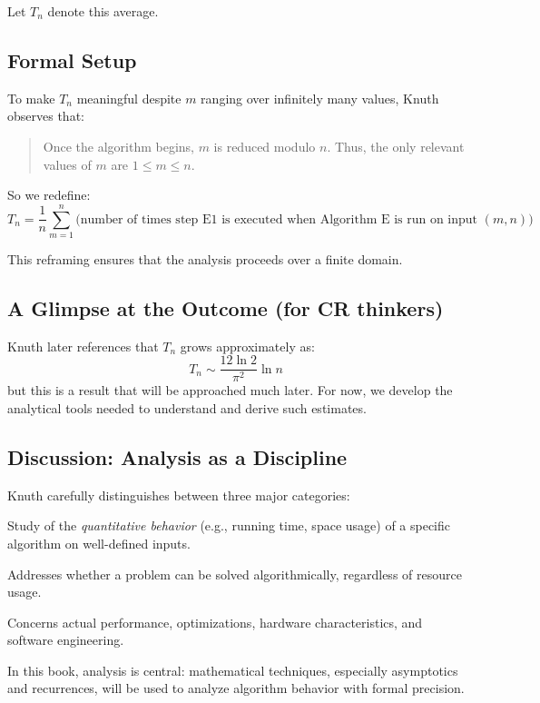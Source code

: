 \documentclass{article}
\begin{document}
Let $T_n$ denote this average.

\subsection*{Formal Setup}

To make $T_n$ meaningful despite $m$ ranging over infinitely many values, Knuth observes that:

\begin{quote}
Once the algorithm begins, $m$ is reduced modulo $n$. Thus, the only relevant values of $m$ are $1 \le m \le n$.
\end{quote}

So we redefine:
\[
T_n = \frac{1}{n} \sum_{m=1}^{n} \text{(number of times step E1 is executed when Algorithm E is run on input } (m,n))
\]

This reframing ensures that the analysis proceeds over a finite domain.

\subsection*{A Glimpse at the Outcome (for CR thinkers)}

Knuth later references that $T_n$ grows approximately as:
\[
T_n \sim \frac{12 \ln 2}{\pi^2} \ln n
\]
but this is a result that will be approached much later. For now, we develop the analytical tools needed to understand and derive such estimates.

\subsection*{Discussion: Analysis as a Discipline}

Knuth carefully distinguishes between three major categories:

\begin{description}[style=nextline]
    \item[Algorithm Analysis:] Study of the \emph{quantitative behavior} (e.g., running time, space usage) of a specific algorithm on well-defined inputs.
    \item[Algorithm Theory:] Addresses whether a problem can be solved algorithmically, regardless of resource usage.
    \item[Implementation:] Concerns actual performance, optimizations, hardware characteristics, and software engineering.
\end{description}

In this book, analysis is central: mathematical techniques, especially asymptotics and recurrences, will be used to analyze algorithm behavior with formal precision.
\end{document}
